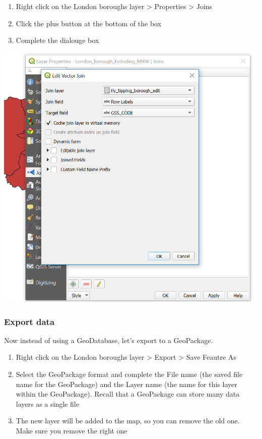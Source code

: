 \documentclass[]{book}
\providecommand{\tightlist}{%
  \setlength{\itemsep}{0pt}\setlength{\parskip}{0pt}}
\begin{document}
\begin{enumerate}
\def\labelenumi{\arabic{enumi}.}
\setcounter{enumi}{8}
\tightlist
\item
  Right click on the London boroughs layer \textgreater{} Properties \textgreater{} Joins
\item
  Click the plus button at the bottom of the box
\item
  Complete the dialouge box
\end{enumerate}

\begin{center}\includegraphics[width=500pt]{prac1_images/qgis_join} \end{center}

\hypertarget{export-data-1}{%
\subsubsection{Export data}\label{export-data-1}}

Now instead of using a GeoDatabase, let's export to a GeoPackage.

\begin{enumerate}
\def\labelenumi{\arabic{enumi}.}
\setcounter{enumi}{11}
\tightlist
\item
  Right click on the London boroughs layer \textgreater{} Export \textgreater{} Save Feautre As
\item
  Select the GeoPackage format and complete the File name (the saved file name for the GeoPackage) and the Layer name (the name for this layer within the GeoPackage). Recall that a GeoPackage can store many data layers as a single file
\item
  The new layer will be added to the map, so you can remove the old one. Make sure you remove the right one
\end{enumerate}
\end{document}
